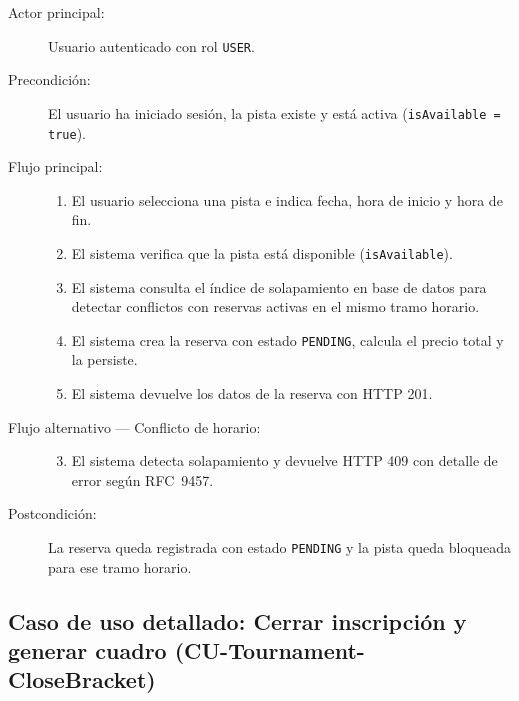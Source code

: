 \begin{description}
  \item[Actor principal:]\leavevmode Usuario autenticado con rol \texttt{USER}.
  \item[Precondición:]\leavevmode El usuario ha iniciado sesión, la pista existe y está
    activa (\texttt{isAvailable = true}).
  \item[Flujo principal:]\leavevmode
    \begin{enumerate}
      \item El usuario selecciona una pista e indica fecha, hora de inicio y
        hora de fin.
      \item El sistema verifica que la pista está disponible
        (\texttt{isAvailable}).
      \item El sistema consulta el índice de solapamiento en base de datos para
        detectar conflictos con reservas activas en el mismo tramo horario.
      \item El sistema crea la reserva con estado \texttt{PENDING}, calcula el
        precio total y la persiste.
      \item El sistema devuelve los datos de la reserva con HTTP 201.
    \end{enumerate}
  \item[Flujo alternativo — Conflicto de horario:]\leavevmode
    \begin{enumerate}
      \setcounter{enumi}{2}
      \item El sistema detecta solapamiento y devuelve HTTP 409 con detalle
        de error según RFC~9457.
    \end{enumerate}
  \item[Postcondición:]\leavevmode La reserva queda registrada con estado \texttt{PENDING}
    y la pista queda bloqueada para ese tramo horario.
\end{description}

\subsection{Caso de uso detallado: Cerrar inscripción y generar cuadro (CU-Tournament-CloseBracket)}

